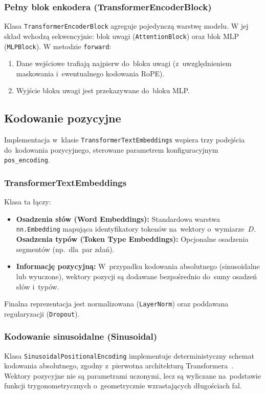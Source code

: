 \documentclass[a4paper,11pt,twoside]{report}
\theoremstyle{definition}
\begin{document}
\subsubsection{Pełny blok enkodera (TransformerEncoderBlock)}
Klasa \texttt{TransformerEncoderBlock} agreguje pojedynczą warstwę modelu. W jej skład wchodzą sekwencyjnie: blok uwagi (\texttt{AttentionBlock}) oraz blok MLP (\texttt{MLPBlock}).
W metodzie \texttt{forward}:
\begin{enumerate}
    \item Dane wejściowe trafiają najpierw do~bloku uwagi (z~uwzględnieniem maskowania i~ewentualnego kodowania RoPE).
    \item Wyjście bloku uwagi jest przekazywane do~bloku MLP.
\end{enumerate}

\subsection{Kodowanie pozycyjne} \label{sec:pos-encoding}

Implementacja w~klasie \texttt{TransformerTextEmbeddings} wspiera trzy podejścia do~kodowania pozycyjnego, sterowane parametrem konfiguracyjnym \texttt{pos\_encoding}.

\subsubsection{TransformerTextEmbeddings}
Klasa ta łączy:
\begin{itemize}
    \item \textbf{Osadzenia słów (Word Embeddings):} Standardowa warstwa \texttt{nn.Embedding} mapująca identyfikatory tokenów na~wektory o~wymiarze~$D$.
    \textbf{Osadzenia typów (Token Type Embeddings):} Opcjonalne osadzenia segmentów (np.\ dla~par zdań).
    \item \textbf{Informację pozycyjną:} W~przypadku kodowania absolutnego (sinusoidalne lub wyuczone), wektory pozycji są dodawane bezpośrednio do~sumy osadzeń słów i~typów.
\end{itemize}
Finalna reprezentacja jest normalizowana (\texttt{LayerNorm}) oraz poddawana regularyzacji (\texttt{Dropout}).

\subsubsection{Kodowanie sinusoidalne (Sinusoidal)}
Klasa \texttt{SinusoidalPositionalEncoding} implementuje deterministyczny schemat kodowania absolutnego, zgodny z~pierwotna architekturą Transformera~\cite{vaswani2017attention}. Wektory pozycyjne nie są parametrami uczonymi, lecz są wyliczane na~podstawie funkcji trygonometrycznych o~geometrycznie wzrastających długościach fal.
\end{document}
